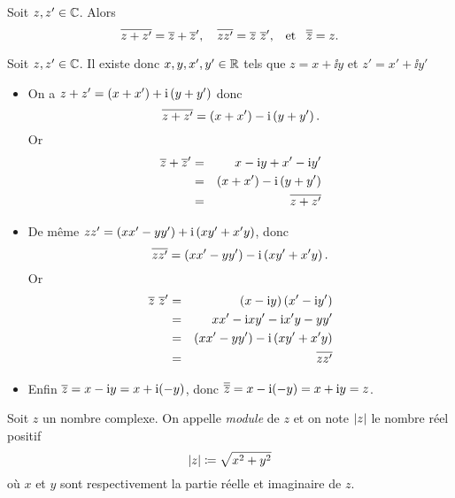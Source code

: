 \documentclass{magnoliaold}
\begin{document}
\begin{proposition}[utile=-3]
  Soit $z,z'\in\mathbb{C}$. Alors
 \[\overline{z+z'}=\overline{z}+\overline{z}', \quad \overline{z z'}=\overline{z}\ \overline{z}', \quad\!\text{et}\quad\! \overline{\overline{z}}=z.\]
\end{proposition}
\begin{preuve} Soit $z,z'\in\mathbb{C}$. Il existe donc $x,y,x',y'\in\mathbb{R}$ tels que
    $z=x+\ii y$ et $z'=x'+\ii y'$
  \begin{itemize}
  \item On a $z+z'=\left(x+x'\right)+{\rm i} \left(y+y'\right)$ donc
    \[\overline{z+z'}=\left(x+x'\right)-{\rm i} \left(y+y'\right).\] Or
    \begin{eqnarray*}
    \overline{z}+\overline{z}'
    &=& x-{\rm i} y+x'-{\rm i} y'\\
    &=& \left(x+x'\right)-{\rm i} \left(y+y'\right)\\
    &=& \overline{z+z'}
    \end{eqnarray*}
  \item
    De même $zz'=\left(xx'-yy'\right)+{\rm i} \left(xy'+x'y\right)$, donc
    \[\overline{zz'}=\left(xx'-yy'\right)-{\rm i} \left(xy'+x'y\right).\] Or
    \begin{eqnarray*}
    \overline{z}\ \overline{z}'
    &=& \left(x-{\rm i} y\right)\left(x'-{\rm i} y'\right)\\
    &=& xx'-{\rm i} xy'-{\rm i} x'y-yy'\\
    &=& \left(xx'-yy'\right)-{\rm i} \left(xy'+x'y\right)\\
    &=& \overline{z z'}
    \end{eqnarray*}
  \item Enfin $\overline{z}=x-{\rm i} y=x+{\rm i}(-y)$, donc
    $\overline{\overline{z}}=x-{\rm i}(-y)=x+{\rm i} y=z$.
  \end{itemize}
\end{preuve}

\begin{definition}[utile=-3]
Soit $z$ un nombre complexe. On appelle \emph{module} de $z$ et on note $\left|z\right|$ le nombre réel positif
\[\left|z\right|\coloneqq\sqrt{x^2+y^2}\]
où $x$ et $y$ sont respectivement la partie réelle et imaginaire de $z$.
\end{definition}
\end{document}
